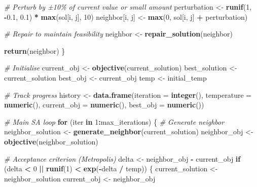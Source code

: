 \documentclass[
]{article}
\newenvironment{Shaded}{\begin{snugshade}}{\end{snugshade}}
\newcommand{\AttributeTok}[1]{\textcolor[rgb]{0.13,0.29,0.53}{#1}}
\newcommand{\CommentTok}[1]{\textcolor[rgb]{0.56,0.35,0.01}{\textit{#1}}}
\newcommand{\ControlFlowTok}[1]{\textcolor[rgb]{0.13,0.29,0.53}{\textbf{#1}}}
\newcommand{\DecValTok}[1]{\textcolor[rgb]{0.00,0.00,0.81}{#1}}
\newcommand{\FloatTok}[1]{\textcolor[rgb]{0.00,0.00,0.81}{#1}}
\newcommand{\FunctionTok}[1]{\textcolor[rgb]{0.13,0.29,0.53}{\textbf{#1}}}
\newcommand{\NormalTok}[1]{#1}
\newcommand{\OtherTok}[1]{\textcolor[rgb]{0.56,0.35,0.01}{#1}}
\newcommand{\SpecialCharTok}[1]{\textcolor[rgb]{0.81,0.36,0.00}{\textbf{#1}}}
\begin{document}
\begin{Shaded}
\begin{Highlighting}[]
    \CommentTok{\# Perturb by ±10\% of current value or small amount}
\NormalTok{    perturbation }\OtherTok{\textless{}{-}} \FunctionTok{runif}\NormalTok{(}\DecValTok{1}\NormalTok{, }\SpecialCharTok{{-}}\FloatTok{0.1}\NormalTok{, }\FloatTok{0.1}\NormalTok{) }\SpecialCharTok{*} \FunctionTok{max}\NormalTok{(sol[i, j], }\DecValTok{10}\NormalTok{)}
\NormalTok{    neighbor[i, j] }\OtherTok{\textless{}{-}} \FunctionTok{max}\NormalTok{(}\DecValTok{0}\NormalTok{, sol[i, j] }\SpecialCharTok{+}\NormalTok{ perturbation)}
    
    \CommentTok{\# Repair to maintain feasibility}
\NormalTok{    neighbor }\OtherTok{\textless{}{-}} \FunctionTok{repair\_solution}\NormalTok{(neighbor)}
    
    \FunctionTok{return}\NormalTok{(neighbor)}
\NormalTok{  \}}
  
  \CommentTok{\# Initialise}
\NormalTok{  current\_obj }\OtherTok{\textless{}{-}} \FunctionTok{objective}\NormalTok{(current\_solution)}
\NormalTok{  best\_solution }\OtherTok{\textless{}{-}}\NormalTok{ current\_solution}
\NormalTok{  best\_obj }\OtherTok{\textless{}{-}}\NormalTok{ current\_obj}
\NormalTok{  temp }\OtherTok{\textless{}{-}}\NormalTok{ initial\_temp}
  
  \CommentTok{\# Track progress}
\NormalTok{  history }\OtherTok{\textless{}{-}} \FunctionTok{data.frame}\NormalTok{(}\AttributeTok{iteration =} \FunctionTok{integer}\NormalTok{(), }
                       \AttributeTok{temperature =} \FunctionTok{numeric}\NormalTok{(), }
                       \AttributeTok{current\_obj =} \FunctionTok{numeric}\NormalTok{(),}
                       \AttributeTok{best\_obj =} \FunctionTok{numeric}\NormalTok{())}
  
  \CommentTok{\# Main SA loop}
  \ControlFlowTok{for}\NormalTok{ (iter }\ControlFlowTok{in} \DecValTok{1}\SpecialCharTok{:}\NormalTok{max\_iterations) \{}
    \CommentTok{\# Generate neighbor}
\NormalTok{    neighbor\_solution }\OtherTok{\textless{}{-}} \FunctionTok{generate\_neighbor}\NormalTok{(current\_solution)}
\NormalTok{    neighbor\_obj }\OtherTok{\textless{}{-}} \FunctionTok{objective}\NormalTok{(neighbor\_solution)}
    
    \CommentTok{\# Acceptance criterion (Metropolis)}
\NormalTok{    delta }\OtherTok{\textless{}{-}}\NormalTok{ neighbor\_obj }\SpecialCharTok{{-}}\NormalTok{ current\_obj}
    \ControlFlowTok{if}\NormalTok{ (delta }\SpecialCharTok{\textless{}} \DecValTok{0} \SpecialCharTok{||} \FunctionTok{runif}\NormalTok{(}\DecValTok{1}\NormalTok{) }\SpecialCharTok{\textless{}} \FunctionTok{exp}\NormalTok{(}\SpecialCharTok{{-}}\NormalTok{delta }\SpecialCharTok{/}\NormalTok{ temp)) \{}
\NormalTok{      current\_solution }\OtherTok{\textless{}{-}}\NormalTok{ neighbor\_solution}
\NormalTok{      current\_obj }\OtherTok{\textless{}{-}}\NormalTok{ neighbor\_obj}
      

\end{Highlighting}
\end{Shaded}
\end{document}
